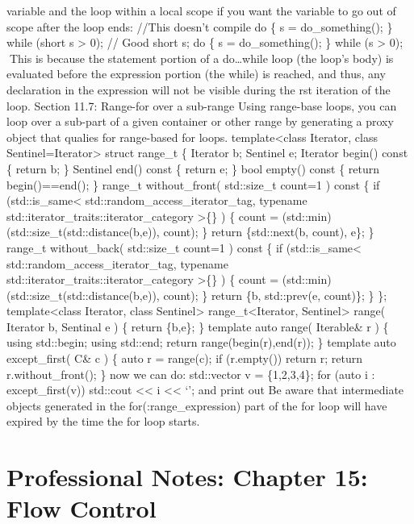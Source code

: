 variable and the loop within a local scope if you want the variable to
go out of scope after the loop ends: //This doesn't compile do \{ s =
do\_something(); \} while (short s \textgreater{} 0); // Good short s;
do \{ s = do\_something(); \} while (s \textgreater{} 0); This is
because the statement portion of a do\ldots while loop (the loop's body)
is evaluated before the expression portion (the while) is reached, and
thus, any declaration in the expression will not be visible during the
rst iteration of the loop. Section 11.7: Range-for over a sub-range
Using range-base loops, you can loop over a sub-part of a given
container or other range by generating a proxy object that qualies for
range-based for loops. template\textless class Iterator, class
Sentinel=Iterator\textgreater{} struct range\_t \{ Iterator b; Sentinel
e; Iterator begin() const \{ return b; \} Sentinel end() const \{ return
e; \} bool empty() const \{ return begin()==end(); \} range\_t
without\_front( std::size\_t count=1 ) const \{ if
(std::is\_same\textless{} std::random\_access\_iterator\_tag, typename
std::iterator\_traits::iterator\_category \textgreater\{\} ) \{ count =
(std::min)(std::size\_t(std::distance(b,e)), count); \} return
\{std::next(b, count), e\}; \} range\_t without\_back( std::size\_t
count=1 ) const \{ if (std::is\_same\textless{}
std::random\_access\_iterator\_tag, typename
std::iterator\_traits::iterator\_category \textgreater\{\} ) \{ count =
(std::min)(std::size\_t(std::distance(b,e)), count); \} return \{b,
std::prev(e, count)\}; \} \}; template\textless class Iterator, class
Sentinel\textgreater{} range\_t\textless Iterator,
Sentinel\textgreater{} range( Iterator b, Sentinal e ) \{ return
\{b,e\}; \} template auto range( Iterable\& r ) \{ using std::begin;
using std::end; return range(begin(r),end(r)); \} template auto
except\_first( C\& c ) \{ auto r = range(c); if (r.empty()) return r;
return r.without\_front(); \} now we can do: std::vector v =
\{1,2,3,4\}; for (auto i : except\_first(v)) std::cout
\textless\textless{} i \textless\textless{} `\n'; and print out Be aware
that intermediate objects generated in the for(:range\_expression) part
of the for loop will have expired by the time the for loop starts.

\hypertarget{professional-notes-chapter-15-flow-control}{%
\chapter{Professional Notes: Chapter 15: Flow
Control}\label{professional-notes-chapter-15-flow-control}}

